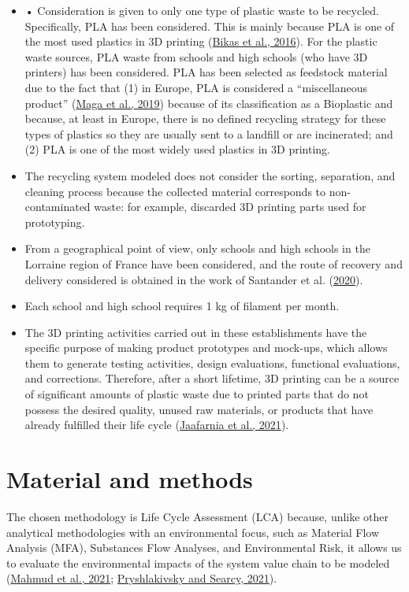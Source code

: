 \documentclass[12pt]{elsarticle} %
\begin{document}
\begin{itemize}
\item
  • Consideration is given to only one type of plastic waste to be recycled. Specifically, PLA has been considered. This is mainly because PLA is one of the most used plastics in 3D printing (\protect\hyperlink{ref-bikas2016}{Bikas et al., 2016}).
  For the plastic waste sources, PLA waste from schools and high schools (who have 3D printers) has been considered.
  PLA has been selected as feedstock material due to the fact that (1) in Europe, PLA is considered a ``miscellaneous product'' (\protect\hyperlink{ref-maga2019}{Maga et al., 2019}) because of its classification as a Bioplastic and because, at least in Europe, there is no defined recycling strategy for these types of plastics so they are usually sent to a landfill or are incinerated;
  and (2) PLA is one of the most widely used plastics in 3D printing.
\item
  The recycling system modeled does not consider the sorting, separation, and cleaning process because the collected material corresponds to non-contaminated waste: for example, discarded 3D printing parts used for prototyping.
\item
  From a geographical point of view, only schools and high schools in the Lorraine region of France have been considered, and the route of recovery and delivery considered is obtained in the work of Santander et al. (\protect\hyperlink{ref-Santander2020}{2020}).
\item
  Each school and high school requires 1 kg of filament per month.
\item
  The 3D printing activities carried out in these establishments have the specific purpose of making product prototypes and mock-ups, which allows them to generate testing activities, design evaluations, functional evaluations, and corrections. Therefore, after a short lifetime, 3D printing can be a source of significant amounts of plastic waste due to printed parts that do not possess the desired quality, unused raw materials, or products that have already fulfilled their life cycle (\protect\hyperlink{ref-Jaafarnia2021}{Jaafarnia et al., 2021}).
\end{itemize}

\hypertarget{MM}{%
\section{Material and methods}\label{MM}}

The chosen methodology is Life Cycle Assessment (LCA) because, unlike other analytical methodologies with an environmental focus, such as Material Flow Analysis (MFA), Substances Flow Analyses, and Environmental Risk, it allows us to evaluate the environmental impacts of the system value chain to be modeled (\protect\hyperlink{ref-Mahmud2021}{Mahmud et al., 2021}; \protect\hyperlink{ref-Pryshlakivsky2021}{Pryshlakivsky and Searcy, 2021}).
\end{document}
